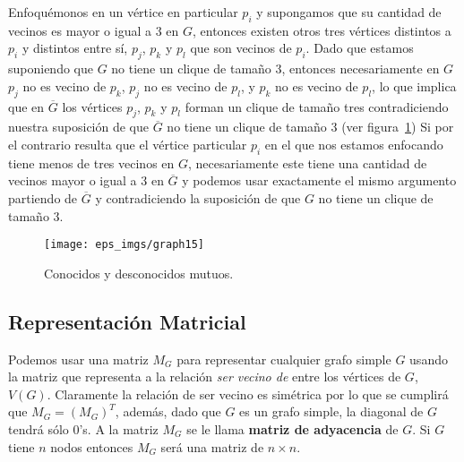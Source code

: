 \begin{ejemplo}
Enfoquémonos en un vértice en particular $p_i$ y supongamos que su cantidad de vecinos es mayor o igual a 3 en $G$, entonces existen otros tres vértices distintos a $p_i$ y distintos entre sí, $p_j$, $p_k$ y $p_l$ que son vecinos de $p_i$.
Dado que estamos suponiendo que $G$ no tiene un clique de tamaño 3, entonces necesariamente en $G$ $p_j$ no es vecino de $p_k$, $p_j$ no es vecino de $p_l$, y $p_k$ no es vecino de $p_l$, lo que implica que en $\overline G$ los vértices $p_j$, $p_k$ y $p_l$ forman un clique de tamaño tres contradiciendo nuestra suposición de que $\overline G$ no tiene un clique de tamaño 3 (ver figura~\ref{fig:graph15})
Si por el contrario resulta que el vértice particular $p_i$ en el que nos estamos enfocando tiene menos de tres vecinos en $G$, necesariamente este tiene una cantidad de vecinos mayor o igual a 3 en $\overline G$ y podemos usar exactamente el mismo argumento partiendo de $\overline G$ y contradiciendo la suposición de que $G$ no tiene un clique de tamaño 3.
\begin{figure}[h!]
\centering
\texttt{[image: eps\_imgs/graph15]}
\caption{Conocidos y desconocidos mutuos.}
\label{fig:graph15}
\end{figure}
\end{ejemplo}

\subsection{Representación Matricial}

Podemos usar una matriz $M_G$ para representar cualquier grafo simple $G$ usando la matriz que representa a la relación \emph{ser vecino de} entre los vértices de $G$, $V(G)$.
Claramente la relación de ser vecino es simétrica por lo que se cumplirá que $M_G=(M_G)^T$, además, dado que $G$ es un grafo simple, la diagonal de $G$ tendrá sólo 0's.
A la matriz $M_G$ se le llama {\bf matriz de adyacencia} de $G$.
Si $G$ tiene $n$ nodos entonces $M_G$ será una matriz de $n\times n$.

